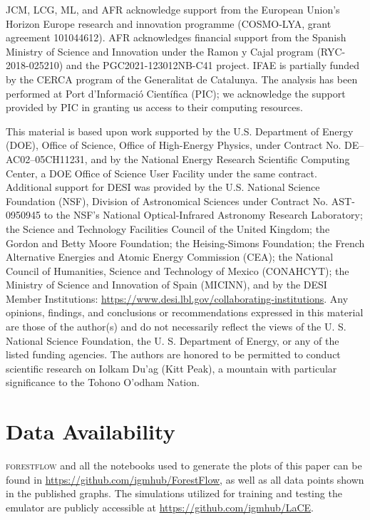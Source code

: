 \documentclass[longauth]{aa}
\newcommand{\forestflow}{\textsc{forestflow}\xspace}
\begin{document}

\begin{acknowledgements}
JCM, LCG, ML, and AFR acknowledge support from the European Union’s Horizon Europe research and innovation programme (COSMO-LYA, grant agreement 101044612). AFR acknowledges financial support from the Spanish Ministry of Science and Innovation under the Ramon y Cajal program (RYC-2018-025210) and the PGC2021-123012NB-C41 project. IFAE is partially funded by the CERCA program of the Generalitat de Catalunya. The analysis has been performed at Port d’Informaci\'o Cient\'ifica (PIC); we acknowledge the support provided by PIC in granting us access to their computing resources.

This material is based upon work supported by the U.S. Department of Energy (DOE), Office of Science, Office of High-Energy Physics, under Contract No. DE–AC02–05CH11231, and by the National Energy Research Scientific Computing Center, a DOE Office of Science User Facility under the same contract. Additional support for DESI was provided by the U.S. National Science Foundation (NSF), Division of Astronomical Sciences under Contract No. AST-0950945 to the NSF’s National Optical-Infrared Astronomy Research Laboratory; the Science and Technology Facilities Council of the United Kingdom; the Gordon and Betty Moore Foundation; the Heising-Simons Foundation; the French Alternative Energies and Atomic Energy Commission (CEA); the National Council of Humanities, Science and Technology of Mexico (CONAHCYT); the Ministry of Science and Innovation of Spain (MICINN), and by the DESI Member Institutions: \url{https://www.desi.lbl.gov/collaborating-institutions}. Any opinions, findings, and conclusions or recommendations expressed in this material are those of the author(s) and do not necessarily reflect the views of the U. S. National Science Foundation, the U. S. Department of Energy, or any of the listed funding agencies. The authors are honored to be permitted to conduct scientific research on Iolkam Du’ag (Kitt Peak), a mountain with particular significance to the Tohono O’odham Nation.
\end{acknowledgements}

\section*{Data Availability}

\forestflow and all the notebooks used to generate the plots of this paper can be found in \url{https://github.com/igmhub/ForestFlow}, as well as all data points shown in the published graphs. The simulations utilized for training and testing the emulator are publicly accessible at \url{https://github.com/igmhub/LaCE}.
\end{document}
